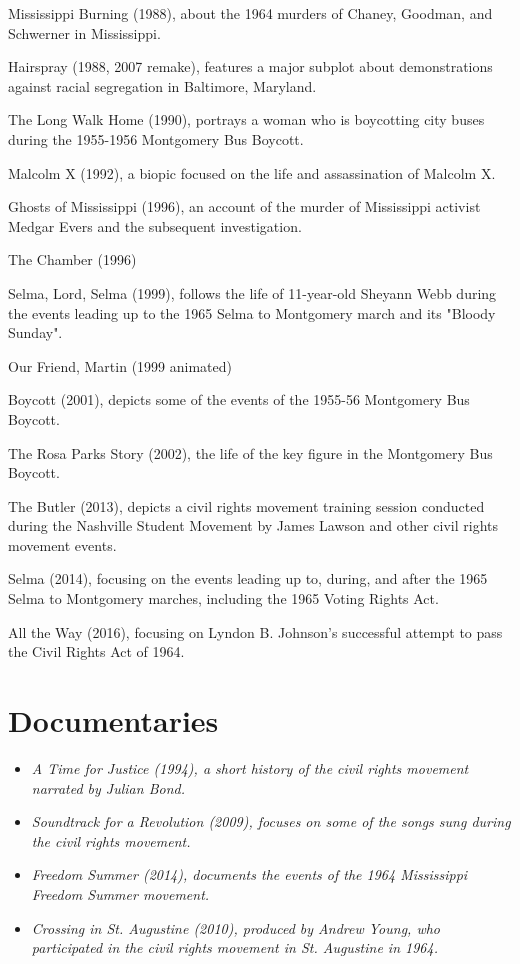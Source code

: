 Mississippi Burning (1988), about the 1964 murders of Chaney, Goodman,
and Schwerner in Mississippi.

Hairspray (1988, 2007 remake), features a major subplot about
demonstrations against racial segregation in Baltimore, Maryland.

The Long Walk Home (1990), portrays a woman who is boycotting city buses
during the 1955-1956 Montgomery Bus Boycott.

Malcolm X (1992), a biopic focused on the life and assassination of
Malcolm X.

Ghosts of Mississippi (1996), an account of the murder of Mississippi
activist Medgar Evers and the subsequent investigation.

The Chamber (1996)

Selma, Lord, Selma (1999), follows the life of 11-year-old Sheyann Webb
during the events leading up to the 1965 Selma to Montgomery march and
its "Bloody Sunday".

Our Friend, Martin (1999 animated)

Boycott (2001), depicts some of the events of the 1955-56 Montgomery Bus
Boycott.

The Rosa Parks Story (2002), the life of the key figure in the
Montgomery Bus Boycott.

The Butler (2013), depicts a civil rights movement training session
conducted during the Nashville Student Movement by James Lawson and
other civil rights movement events.

Selma (2014), focusing on the events leading up to, during, and after
the 1965 Selma to Montgomery marches, including the 1965 Voting Rights
Act.

All the Way (2016), focusing on Lyndon B. Johnson's successful attempt
to pass the Civil Rights Act of 1964.

\section{Documentaries}\label{documentaries}

\begin{itemize}
\item
  \emph{A Time for Justice (1994), a short history of the civil rights
  movement narrated by Julian Bond.}
\item
  \emph{Soundtrack for a Revolution (2009), focuses on some of the songs
  sung during the civil rights movement.}
\item
  \emph{Freedom Summer (2014), documents the events of the 1964
  Mississippi Freedom Summer movement.}
\item
  \emph{Crossing in St. Augustine (2010), produced by Andrew Young, who
  participated in the civil rights movement in St. Augustine in 1964.}
\end{itemize}


